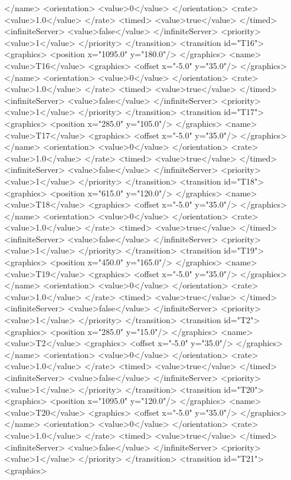 </name>
<orientation>
<value>0</value>
</orientation>
<rate>
<value>1.0</value>
</rate>
<timed>
<value>true</value>
</timed>
<infiniteServer>
<value>false</value>
</infiniteServer>
<priority>
<value>1</value>
</priority>
</transition>
<transition id="T16">
<graphics>
<position x="1095.0" y="180.0"/>
</graphics>
<name>
<value>T16</value>
<graphics>
<offset x="-5.0" y="35.0"/>
</graphics>
</name>
<orientation>
<value>0</value>
</orientation>
<rate>
<value>1.0</value>
</rate>
<timed>
<value>true</value>
</timed>
<infiniteServer>
<value>false</value>
</infiniteServer>
<priority>
<value>1</value>
</priority>
</transition>
<transition id="T17">
<graphics>
<position x="285.0" y="105.0"/>
</graphics>
<name>
<value>T17</value>
<graphics>
<offset x="-5.0" y="35.0"/>
</graphics>
</name>
<orientation>
<value>0</value>
</orientation>
<rate>
<value>1.0</value>
</rate>
<timed>
<value>true</value>
</timed>
<infiniteServer>
<value>false</value>
</infiniteServer>
<priority>
<value>1</value>
</priority>
</transition>
<transition id="T18">
<graphics>
<position x="615.0" y="120.0"/>
</graphics>
<name>
<value>T18</value>
<graphics>
<offset x="-5.0" y="35.0"/>
</graphics>
</name>
<orientation>
<value>0</value>
</orientation>
<rate>
<value>1.0</value>
</rate>
<timed>
<value>true</value>
</timed>
<infiniteServer>
<value>false</value>
</infiniteServer>
<priority>
<value>1</value>
</priority>
</transition>
<transition id="T19">
<graphics>
<position x="450.0" y="165.0"/>
</graphics>
<name>
<value>T19</value>
<graphics>
<offset x="-5.0" y="35.0"/>
</graphics>
</name>
<orientation>
<value>0</value>
</orientation>
<rate>
<value>1.0</value>
</rate>
<timed>
<value>true</value>
</timed>
<infiniteServer>
<value>false</value>
</infiniteServer>
<priority>
<value>1</value>
</priority>
</transition>
<transition id="T2">
<graphics>
<position x="285.0" y="15.0"/>
</graphics>
<name>
<value>T2</value>
<graphics>
<offset x="-5.0" y="35.0"/>
</graphics>
</name>
<orientation>
<value>0</value>
</orientation>
<rate>
<value>1.0</value>
</rate>
<timed>
<value>true</value>
</timed>
<infiniteServer>
<value>false</value>
</infiniteServer>
<priority>
<value>1</value>
</priority>
</transition>
<transition id="T20">
<graphics>
<position x="1095.0" y="120.0"/>
</graphics>
<name>
<value>T20</value>
<graphics>
<offset x="-5.0" y="35.0"/>
</graphics>
</name>
<orientation>
<value>0</value>
</orientation>
<rate>
<value>1.0</value>
</rate>
<timed>
<value>true</value>
</timed>
<infiniteServer>
<value>false</value>
</infiniteServer>
<priority>
<value>1</value>
</priority>
</transition>
<transition id="T21">
<graphics>
